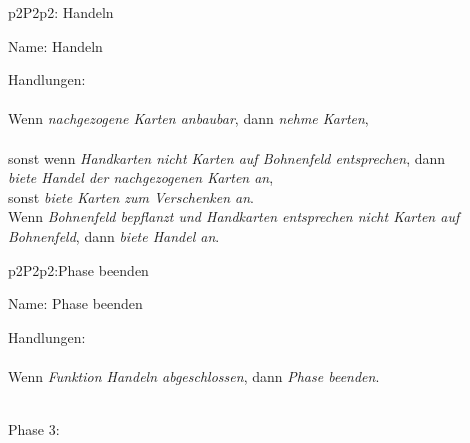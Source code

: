 \begin{description}[leftmargin=5em, style=sameline]
	
	\begin{lhp}{p2}{P2}{p2: Handeln}
		\item [Name:] Handeln
		\item [Handlungen:]\hfill\\ 
		\\Wenn {\itshape nachgezogene Karten anbaubar}, dann 
		{\itshape nehme Karten},\\
		\\sonst wenn {\itshape Handkarten nicht Karten auf Bohnenfeld entsprechen}, dann
		\\{\itshape biete Handel der nachgezogenen Karten an}, 
		\\sonst {\itshape biete Karten zum Verschenken an}.
		\\Wenn {\itshape Bohnenfeld bepflanzt und Handkarten entsprechen nicht Karten auf Bohnenfeld}, dann 
		{\itshape biete Handel an}.\\
	\end{lhp}

	\begin{lhp}{p2}{P2}{p2:Phase beenden}
		\item [Name:] Phase beenden
		\item [Handlungen:]\hfill\\ 
		\\Wenn {\itshape Funktion Handeln abgeschlossen}, dann 
		{\itshape Phase beenden}.\\
	\end{lhp}
	
\end{description}

\hfill\\ Phase 3:\\


